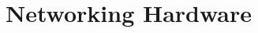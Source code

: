 \newpage
\section{Networking Hardware}
\label{Networking Hardware}
\begin{NexMainBox}
	\begin{NexMainBox}
	\end{NexMainBox}
	\begin{NexMainBox}
	\end{NexMainBox}
\end{NexMainBox}

